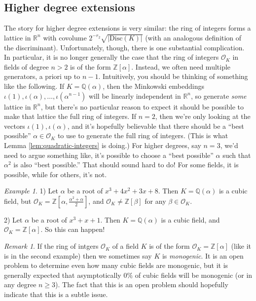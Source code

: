 \documentclass[12pt]{amsart}
\theoremstyle{definition} \newtheorem*{notation}{Notation}
\theoremstyle{remark} \newtheorem*{remark}{Remark}
\theoremstyle{remark} \newtheorem*{example}{Example}
\theoremstyle{definition} \newtheorem*{definition}{Definition}
\numberwithin{equation}{section}
\numberwithin{theorem}{section}
\begin{document}
\subsection{Higher degree extensions}

	The story for higher degree extensions is very similar: the ring of integers forms a lattice in $\mathbb{R}^n$ with covolume $2^{-r_2} \sqrt{|\mathrm{Disc}(K)|}$ (with an analogous definition of the discriminant).  Unfortunately, though, there is one substantial complication.  In particular, it is no longer generally the case that the ring of integers $\mathcal{O}_K$ in fields of degree $n > 2$ is of the form $\mathbb{Z}[\alpha]$.  Instead, we often need multiple generators, a priori up to $n-1$.  Intuitively, you should be thinking of something like the following.  If $K = \mathbb{Q}(\alpha)$, then the Minkowski embeddings $\iota(1),\iota(\alpha),\dots,\iota(\alpha^{n-1})$ will be linearly independent in $\mathbb{R}^n$, so generate \emph{some} lattice in $\mathbb{R}^n$, but there's no particular reason to expect it should be possible to make that lattice the full ring of integers.  If $n=2$, then we're only looking at the vectors $\iota(1),\iota(\alpha)$, and it's hopefully believable that there should be a ``best possible'' $\alpha \in \mathcal{O}_K$ to use to generate the full ring of integers.  (This is what Lemma \ref{lem:quadratic-integers} is doing.)  For higher degrees, say $n=3$, we'd need to argue something like, it's possible to choose a ``best possible'' $\alpha$ such that $\alpha^2$ is also ``best possible.''  That should sound hard to do!  For some fields, it is possible, while for others, it's not.
	
	\begin{example}
		1) Let $\alpha$ be a root of $x^3+4x^2+3x+8$.  Then $K=\mathbb{Q}(\alpha)$ is a cubic field, but $\mathcal{O}_K = \mathbb{Z}[\alpha, \frac{\alpha^2+\alpha}{2}]$, and $\mathcal{O}_K \ne \mathbb{Z}[\beta]$ for any $\beta \in \mathcal{O}_K$.
		
		2) Let $\alpha$ be a root of $x^3+x+1$.  Then $K = \mathbb{Q}(\alpha)$ is a cubic field, and $\mathcal{O}_K = \mathbb{Z}[\alpha]$.  So this can happen!
	\end{example}

	\begin{remark}
		If the ring of intgers $\mathcal{O}_K$ of a field $K$ is of the form $\mathcal{O}_K = \mathbb{Z}[\alpha]$ (like it is in the second example) then we sometimes say $K$ is \emph{monogenic}.  It is an open problem to determine even how many cubic fields are monogenic, but it is generally expected that asymptotically $0\%$ of cubic fields will be monogenic (or in any degree $n \geq 3$).  The fact that this is an open problem should hopefully indicate that this is a subtle issue.
	\end{remark}
	
\end{document}
